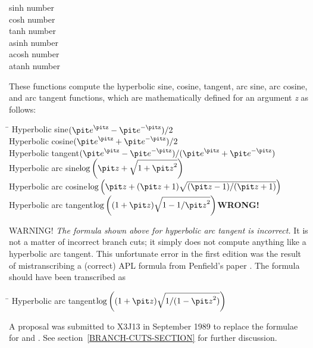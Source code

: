 \begin{defun}[Function]
sinh number \\
cosh number \\
tanh number \\
asinh number \\
acosh number \\
atanh number

\begin{obsolete}\noindent
These functions compute the hyperbolic sine, cosine, tangent,
arc sine, arc cosine, and arc tangent functions, which are mathematically
defined for an argument {\it z} as follows:

\begin{tabbing}
\hskip 10pc\=\kill
Hyperbolic sine\>\( ({\it e}^{\hbox{\scriptsize\it z}}-{\it e}^{-\hbox{\scriptsize\it z}})/2 \) \\
Hyperbolic cosine\>\( ({\it e}^{\hbox{\scriptsize\it z}}+{\it e}^{-\hbox{\scriptsize\it z}})/2 \) \\
Hyperbolic tangent\>\( ({\it e}^{\hbox{\scriptsize\it z}}-{\it e}^{-\hbox{\scriptsize\it z}})/({\it e}^{\hbox{\scriptsize\it z}}+{\it e}^{-\hbox{\scriptsize\it z}}) \) \\[2pt]
Hyperbolic arc sine\>\( \log \left({\it z}+\sqrt{1+{\it z}^2}\right) \) \\[2pt]
Hyperbolic arc cosine\>\( \log \left({\it z}+({\it z}+1)\sqrt{({\it z}-1)/({\it z}+1)}\right) \) \\[2pt]
Hyperbolic arc tangent\>\( \log \left((1+{\it z})\sqrt{1-1/{\it z}^2}\right) \)\`{\bf WRONG!}
\end{tabbing}
\end{obsolete}

\begin{newer}
WARNING!  {\it The formula shown above for hyperbolic arc tangent is incorrect.}
It is not a matter of incorrect branch cuts; it simply does not compute anything
like a hyperbolic arc tangent.  This unfortunate error in the first edition
was the result of mistranscribing a (correct) APL formula from Penfield's paper
\cite{APL-BRANCH-CUTS}.  The formula should have been transcribed as
\begin{tabbing}
\hskip 10pc\=\kill
Hyperbolic arc tangent\>\( \log \left((1+{\it z})\sqrt{1/(1-{\it z}^2)}\right) \)
\end{tabbing}
A proposal was submitted to X3J13 in September 1989 to replace the
formulae for  and .
See section~\ref{BRANCH-CUTS-SECTION} for further discussion.
\end{newer}


\end{defun}
